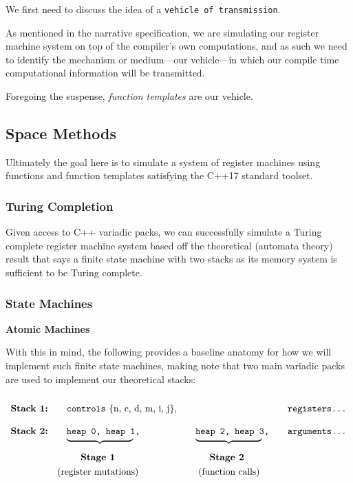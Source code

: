\documentclass[twoside]{article}
\newcommand{\strong}[1]{{\bfseries #1}}
\newcommand{\bfmbox}[1]{\mbox{\bfseries #1}}
\newcommand{\tab}[1][1.125cm]{\hspace{#1}}
\newcommand{\col}[1][0ex]{& \hspace{#1}}
\begin{document}
We first need to discuss the idea of a \texttt{vehicle of transmission}.

As mentioned in the narrative specification, we are simulating our register machine system on top of the compiler's own
computations, and as such we need to identify the mechanism or medium---our vehicle---in which our compile time computational
information will be transmitted.

Foregoing the suspense, \emph{function templates} are our vehicle.

\subsection*{Space Methods}

Ultimately the goal here is to simulate a system of register machines using functions and function templates
satisfying the C++17 standard toolset.

\subsubsection*{Turing Completion}

Given access to C++ variadic packs, we can successfully simulate a Turing complete register machine system based off the
theoretical (automata theory) result that says a finite state machine with two stacks as its memory system is sufficient
to be Turing complete.

\subsubsection*{State Machines}

\strong{Atomic Machines}

With this in mind, the following provides a baseline anatomy for how we will implement such finite
state machines, making note that two main variadic packs are used to implement our theoretical stacks:

$$ \def\arraystretch{2}
\tab[0cm] \begin{array}{llll}
\bfmbox{Stack 1:} \col[1em]   \texttt{controls}\mbox{ \{n, c, d, m, i, j\},}             \col\col[1em] \texttt{registers\ldots} \\
\bfmbox{Stack 2:} \col[1em]   \texttt{heap 0, heap 1,}  \col[1em]   \texttt{heap 2, heap 3,} \col[1em] \texttt{arguments\ldots} \\[-2em]
		  \col[1em]   \underbrace{\tab[2.5cm]}  \col[1em]   \underbrace{\tab[2.5cm]}                                    \\
		  \col[2.5em] \bfmbox{Stage 1}          \col[2.5em] \bfmbox{Stage 2}                                            \\[-2ex]
		  \col      \mbox{(register mutations)} \col[3ex] \mbox{(function calls)}
\end{array} $$
\end{document}
